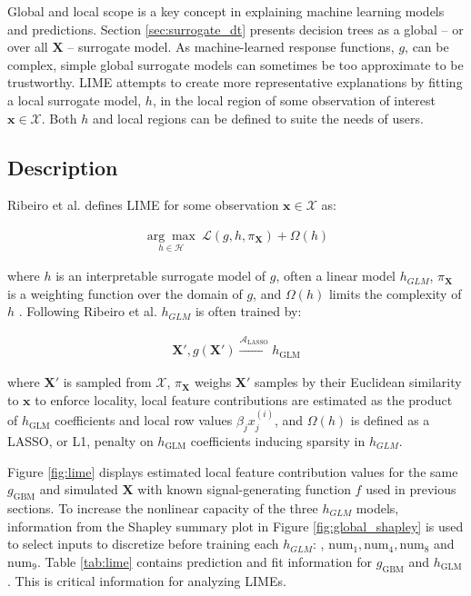 \documentclass[11pt]{asaproc}
\begin{document}
Global and local scope is a key concept in explaining machine learning models and predictions. Section \ref{sec:surrogate_dt} presents decision trees as a global -- or over all $\mathbf{X}$ -- surrogate model. As machine-learned response functions, $g$, can be complex, simple global surrogate models can sometimes be too approximate to be trustworthy. LIME attempts to create more representative explanations by fitting a local surrogate model, $h$, in the local region of some observation of interest $\mathbf{x} \in \mathcal{X}$. Both $h$ and local regions can be defined to suite the needs of users.

\subsection{Description}

Ribeiro et al. defines LIME for some observation $\mathbf{x} \in \mathcal{X}$ as:

\begin{equation}
\begin{aligned}
\underset{h \in \mathcal{H}}{\arg\max}\:\mathcal{L}(g, h, \pi_{\mathbf{X}}) + \Omega(h)
\end{aligned}
\end{equation}

\noindent where $h$ is an interpretable surrogate model of $g$, often a linear model $h_{GLM}$, $\pi_{\mathbf{X}}$ is a weighting function over the domain of $g$, and $\Omega(h)$ limits the complexity of $h$ \cite{lime}. Following Ribeiro et al. $h_{GLM}$ is often trained by:

\begin{equation}
\begin{aligned}
\mathbf{X}', g(\mathbf{X}') \xrightarrow{\mathcal{A}_{\text{LASSO}}} h_{\text{GLM}}
\end{aligned}
\end{equation}

\noindent where $\mathbf{X}'$ is sampled from $\mathcal{X}$, $\pi_{\mathbf{X}}$ weighs $\mathbf{X}'$ samples by their Euclidean similarity to $\mathbf{x}$ to enforce locality, local feature contributions are estimated as the product of $h_{\text{GLM}}$ coefficients and local row values $\beta_j x^{(i)}_j$, and $\Omega(h)$ is defined as a LASSO, or L1, penalty on $h_{\text{GLM}}$ coefficients inducing sparsity in $h_{GLM}$. 		

Figure \ref{fig:lime} displays estimated local feature contribution values for the same $g_{\text{GBM}}$ and simulated $\mathbf{X}$ with known signal-generating function $f$ used in previous sections. To increase the nonlinear capacity of the three $h_{GLM}$ models, information from the Shapley summary plot in Figure \ref{fig:global_shapley} is used to select inputs to discretize before training each $h_{GLM}$: , $\text{num}_1, \text{num}_4, \text{num}_8$ and $\text{num}_9$. Table \ref{tab:lime} contains prediction and fit information for $g_{\text{GBM}}$ and $h_{\text{GLM}}$. This is critical information for analyzing LIMEs.
\end{document}
